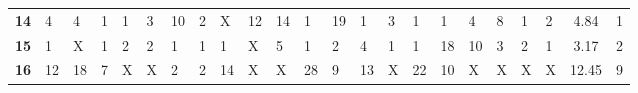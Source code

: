 \begin{table}[t]
\begin{adjustbox}{width=\textwidth}
\begin{tabular}{|c|llllllllllllllllllll|c|c|}
\textbf{14}          & {\color{blue} 4}  & {\color{blue} 4}                      & {\color{blue} 1}                      & {\color{blue} 1}                      & {\color{blue} 3}                      & {\color{blue} 10}                     & {\color{blue} 2}  & {\color{red} X} & {\color{blue} 12}                     & {\color{blue} 14}                     & {\color{blue} 1}                      & {\color{blue} 19}                     & {\color{blue} 1}                      & {\color{blue} 3}                      & {\color{blue} 1}                      & {\color{blue} 1}                      & {\color{blue} 4}                      & {\color{blue} 8}                      & {\color{blue} 1}                      & {\color{blue} 2}                      & 4.84                                                & 1                                                   \\
\textbf{15}          & {\color{blue} 1}  & {\color{red} X} & {\color{blue} 1}                      & {\color{blue} 2}                      & {\color{blue} 2}                      & {\color{blue} 1}                      & {\color{blue} 1}  & {\color{blue} 1}                      & {\color{red} X} & {\color{blue} 5}                      & {\color{blue} 1}                      & {\color{blue} 2}                      & {\color{blue} 4}                      & {\color{blue} 1}                      & {\color{blue} 1}                      & {\color{blue} 18}                     & {\color{blue} 10}                     & {\color{blue} 3}                      & {\color{blue} 2}                      & {\color{blue} 1}                      & 3.17                                                & 2                                                   \\
\textbf{16}          & {\color{blue} 12} & {\color{blue} 18}                     & {\color{blue} 7}                      & {\color{red} X} & {\color{red} X}                      & {\color{blue} 2}                      & {\color{blue} 2}  & {\color{blue} 14}                     & {\color{red} X} & {\color{red} X} & {\color{blue} 28}                     & {\color{blue} 9}                      & {\color{blue} 13}                     & {\color{red} X} & {\color{blue} 22}                     & {\color{blue} 10}                     & {\color{red} X} & {\color{red} X} & {\color{red} X} & {\color{red} X} & 12.45                                               & 9                                                   \\

\end{tabular}
\end{adjustbox}
\end{table}
